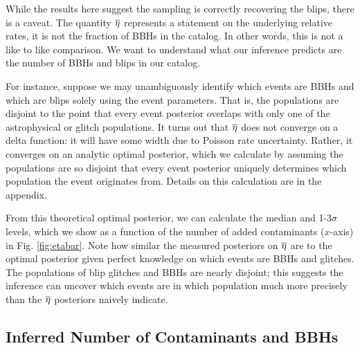\begin{refsection}
While the results here suggest the sampling is correctly recovering the blips, there is a caveat. The quantity $\overline{\eta}$ represents a statement on the underlying relative rates, it is not the fraction 
of BBHs in the catalog. In other words, this is not a like to like comparison. We want to understand what our inference predicts are the number of BBHs and blips in our catalog. 

For instance, suppose we may unambiguously identify which events are BBHs and which are blips solely using the event parameters. That is, the populations are disjoint to the point that every event posterior overlaps with only one of the astrophysical or glitch populations. It turns out that $\overline{\eta}$ does not converge on a delta function: it will have some width due to Poisson rate uncertainty. Rather, it converges on an analytic optimal posterior, which we calculate by assuming the populations are so disjoint that every event posterior uniquely determines which population the event originates from. Details on this calculation are in the appendix.

From this theoretical optimal posterior, we can calculate the median and 1-3$\sigma$ levels, which we show as a function of the number of added contaminants ($x$-axis) in Fig. \ref{fig:etabar}. Note how similar the measured posteriors on $\overline{\eta}$ are to the optimal posterior given perfect knowledge on which events are BBHs and glitches. The populations of blip glitches and BBHs are nearly disjoint; this suggests the inference can uncover which events are in which population much more precisely than the $\overline{\eta}$ posteriors naively indicate. 

\subsection{Inferred Number of Contaminants and BBHs} 


\end{refsection}
